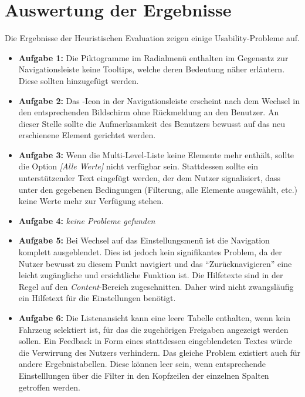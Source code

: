 \section{Auswertung der Ergebnisse} \label{sec:analysisConclusion}
Die Ergebnisse der Heuristischen Evaluation  zeigen einige Usability-Probleme auf.\par
\begin{itemize}
 \item \textbf{Aufgabe 1:} Die Piktogramme im Radialmenü enthalten im Gegensatz zur Navigationsleiste keine Tooltips, welche deren Bedeutung näher erläutern. Diese sollten hinzugefügt werden.
 \item \textbf{Aufgabe 2:} Das -Icon in der Navigationsleiste erscheint nach dem Wechsel in den entsprechenden Bildschirm ohne Rückmeldung an den Benutzer. An dieser Stelle sollte die Aufmerksamkeit des Benutzers bewusst auf das neu erschienene Element gerichtet werden.
 \item \textbf{Aufgabe 3:} Wenn die Multi-Level-Liste keine Elemente mehr enthält, sollte die Option \textit{[Alle Werte]} nicht verfügbar sein. Stattdessen sollte ein unterstützender Text eingefügt werden, der dem Nutzer signalisiert, dass unter den gegebenen Bedingungen (Filterung, alle Elemente ausgewählt, etc.) keine Werte mehr zur Verfügung stehen.
 \item \textbf{Aufgabe 4:} \textit{keine Probleme gefunden}
 \item \textbf{Aufgabe 5:} Bei Wechsel auf das Einstellungsmenü ist die Navigation komplett ausgeblendet. Dies ist jedoch kein signifikantes Problem, da der Nutzer bewusst zu diesem Punkt navigiert und das \enquote{Zurücknavigieren} eine leicht zugängliche und ersichtliche Funktion ist. Die Hilfetexte sind in der Regel auf den \textit{Content}-Bereich zugeschnitten. Daher wird nicht zwangsläufig ein Hilfetext für die Einstellungen benötigt.
 \item \textbf{Aufgabe 6:} Die Listenansicht kann eine leere Tabelle enthalten, wenn kein Fahrzeug selektiert ist, für das die zugehörigen Freigaben angezeigt werden sollen. Ein Feedback in Form eines stattdessen eingeblendeten Textes würde die Verwirrung des Nutzers verhindern. Das gleiche Problem existiert auch für andere Ergebnistabellen. Diese können leer sein, wenn entsprechende Einstelllungen über die Filter in den Kopfzeilen der einzelnen Spalten getroffen werden.
\end{itemize}

